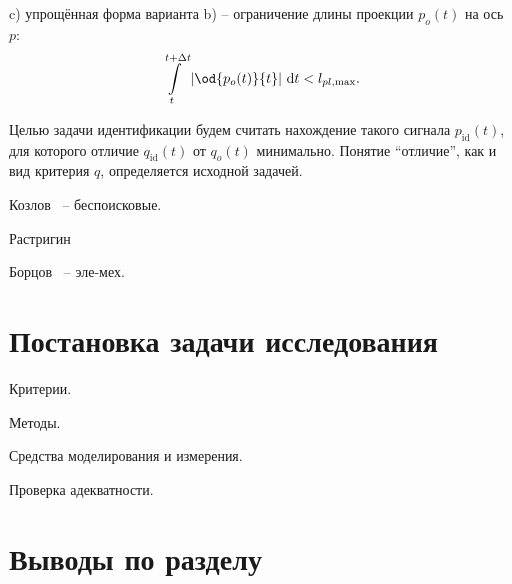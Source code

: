 c) упрощённая форма варианта b) -- ограничение длины проекции  $p_o(t)$ на ось $p$:
\begin{equation}
  \int\limits_{t}^{t+\Delta t} \left| \od{p_o(t)}{t} \right | \, \mathrm{d}t < l_{pl,\max}.
  \label{atu:eq:p_lim_pl}
\end{equation}

Целью задачи идентификации будем считать нахождение
такого сигнала $p_\mathrm{id}(t)$, для которого
отличие $q_\mathrm{id}(t)$ от $q_o(t)$ минимально.
Понятие ``отличие'', как и вид критерия $q$, определяется исходной задачей.





Козлов~\cite{kozlov_nosearch_sns} -- беспоисковые.

Растригин~\cite{rastr_stat_meth_search,rastr_seu,rastr_intro,rastr_adop_complex_sys,rastr_rand_search}

Борцов~\cite{borcov} -- эле-мех.




\section{Постановка задачи исследования}  %

Критерии.

Методы.

Средства моделирования и измерения.

Проверка адекватности.




\section{Выводы по разделу \thechapter}  %




